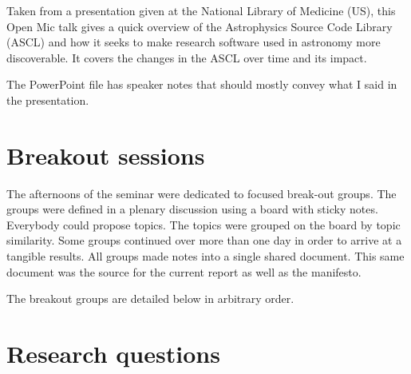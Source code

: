 \documentclass[a4paper,UKenglish]{dagrep}
\begin{document}
Taken from a presentation given at the National Library of Medicine (US), this Open Mic talk gives a quick overview of the Astrophysics Source Code Library (ASCL) and how it seeks to make research software used in astronomy more discoverable. It covers the changes in the ASCL over time and its impact.

The PowerPoint file has speaker notes that should mostly convey what I said in the presentation.

\section{Breakout sessions}

The afternoons of the seminar were dedicated to focused break-out groups. The groups were defined in a plenary discussion using a board with sticky notes. Everybody could propose topics. The topics were grouped on the board by topic similarity. Some groups continued over more than one day in order to arrive at a tangible results. All groups made notes into a single shared document. This same document was the source for the current report as well as the manifesto.

The breakout groups are detailed below in arbitrary order.










\section{Research questions}




\end{document}
